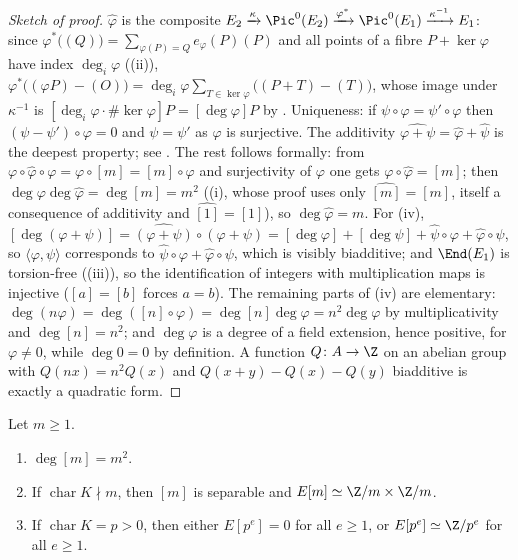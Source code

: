 \begin{proof}[Sketch of proof]
$\hat\varphi$ is the composite $E_2\xrightarrow{\kappa}\Pic^0(E_2)\xrightarrow{\varphi^*}\Pic^0(E_1)\xrightarrow{\kappa^{-1}}E_1$: since
$\varphi^*\bigl((Q)\bigr)=\sum_{\varphi(P)=Q}e_\varphi(P)(P)$ and all points of a fibre $P+\ker\varphi$ have index $\deg_i\varphi$ ((ii)),
$\varphi^*\bigl((\varphi P)-(O)\bigr)=\deg_i\varphi\sum_{T\in\ker\varphi}\bigl((P+T)-(T)\bigr)$, whose image under $\kappa^{-1}$ is $[\deg_i\varphi\cdot\#\ker\varphi]P=[\deg\varphi]P$ by
. Uniqueness: if $\psi\circ\varphi=\psi'\circ\varphi$ then $(\psi-\psi')\circ\varphi=0$ and $\psi=\psi'$ as $\varphi$ is surjective. The
additivity $\widehat{\varphi+\psi}=\hat\varphi+\hat\psi$ is the deepest property; see \cite[Section III.6]{SilvermanAEC}. The rest follows formally: from
$\varphi\circ\hat\varphi\circ\varphi=\varphi\circ[m]=[m]\circ\varphi$ and surjectivity of $\varphi$ one gets $\varphi\circ\hat\varphi=[m]$; then $\deg\varphi\deg\hat\varphi=\deg[m]=m^2$
((i), whose proof uses only $\widehat{[m]}=[m]$, itself a consequence of additivity and $\hat{[1]}=[1]$), so $\deg\hat\varphi=m$. For (iv),
$[\deg(\varphi+\psi)]=\widehat{(\varphi+\psi)}\circ(\varphi+\psi)=[\deg\varphi]+[\deg\psi]+\hat\psi\circ\varphi+\hat\varphi\circ\psi$, so $\langle\varphi,\psi\rangle$ corresponds to
$\hat\psi\circ\varphi+\hat\varphi\circ\psi$, which is visibly biadditive; and $\End(E_1)$ is torsion-free ((iii)), so the
identification of integers with multiplication maps is injective ($[a]=[b]$ forces $a=b$). The remaining parts of (iv) are elementary: $\deg(n\varphi)=\deg([n]\circ\varphi)=\deg[n]\deg\varphi=n^2\deg\varphi$
by multiplicativity and $\deg[n]=n^2$; and $\deg\varphi$ is a degree of a field extension, hence positive, for $\varphi\ne0$, while $\deg0=0$ by definition. A function
$Q\colon A\to\Z$ on an abelian group with $Q(nx)=n^2Q(x)$ and $Q(x+y)-Q(x)-Q(y)$ biadditive is exactly a quadratic form.
\end{proof}

\begin{corollary}\label{cor:ellcurves:degm}
Let $m\ge1$.
\begin{enumerate}[label=(\roman*)]
\item $\deg[m]=m^2$.
\item If $\operatorname{char}K\nmid m$, then $[m]$ is separable and $E[m]\simeq\Z/m\times\Z/m$.
\item If $\operatorname{char}K=p>0$, then either $E[p^e]=0$ for all $e\ge1$, or $E[p^e]\simeq\Z/p^e$ for all $e\ge1$.
\end{enumerate}
\end{corollary}

